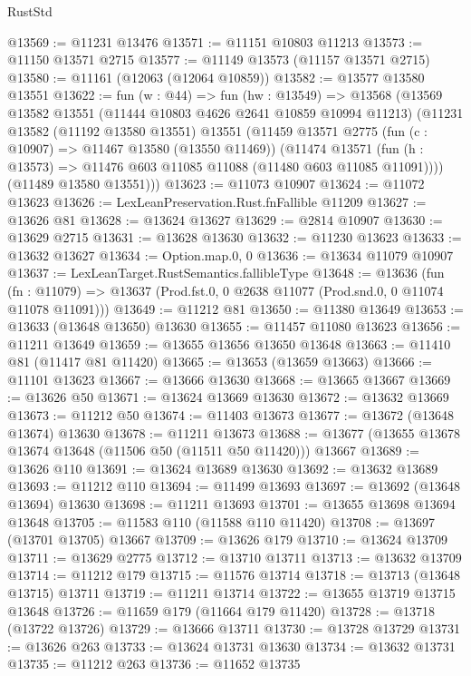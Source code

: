 \begin{lexlean}{RustStd}
\begin{coremodule}
@13569 := @11231 @13476
@13571 := @11151 @10803 @11213
@13573 := @11150 @13571 @2715
@13577 := @11149 @13573 (@11157 @13571 @2715)
@13580 := @11161 (@12063 (@12064 @10859))
@13582 := @13577 @13580 @13551
@13622 := fun (w : @44) =>
  fun (hw : @13549) =>
  @13568
    (@13569
      @13582
      @13551
      (@11444 @10803 @4626 @2641 @10859 @10994 @11213)
      (@11231
        @13582
        (@11192 @13580 @13551)
        @13551
        (@11459
          @13571
          @2775
          (fun (c : @10907) => @11467 @13580 (@13550 @11469))
          (@11474
            @13571
            (fun (h : @13573) => @11476 @603 @11085 @11088 (@11480 @603 @11085 @11091))))
        (@11489 @13580 @13551)))
@13623 := @11073 @10907
@13624 := @11072 @13623
@13626 := LexLeanPreservation.Rust.fnFallible @11209
@13627 := @13626 @81
@13628 := @13624 @13627
@13629 := @2814 @10907
@13630 := @13629 @2715
@13631 := @13628 @13630
@13632 := @11230 @13623
@13633 := @13632 @13627
@13634 := Option.map.{0, 0}
@13636 := @13634 @11079 @10907
@13637 := LexLeanTarget.RustSemantics.fallibleType
@13648 := @13636
    (fun (fn : @11079) =>
    @13637 (Prod.fst.{0, 0} @2638 @11077 (Prod.snd.{0, 0} @11074 @11078 @11091)))
@13649 := @11212 @81
@13650 := @11380 @13649
@13653 := @13633 (@13648 @13650) @13630
@13655 := @11457 @11080 @13623
@13656 := @11211 @13649
@13659 := @13655 @13656 @13650 @13648
@13663 := @11410 @81 (@11417 @81 @11420)
@13665 := @13653 (@13659 @13663)
@13666 := @11101 @13623
@13667 := @13666 @13630
@13668 := @13665 @13667
@13669 := @13626 @50
@13671 := @13624 @13669 @13630
@13672 := @13632 @13669
@13673 := @11212 @50
@13674 := @11403 @13673
@13677 := @13672 (@13648 @13674) @13630
@13678 := @11211 @13673
@13688 := @13677 (@13655 @13678 @13674 @13648 (@11506 @50 (@11511 @50 @11420))) @13667
@13689 := @13626 @110
@13691 := @13624 @13689 @13630
@13692 := @13632 @13689
@13693 := @11212 @110
@13694 := @11499 @13693
@13697 := @13692 (@13648 @13694) @13630
@13698 := @11211 @13693
@13701 := @13655 @13698 @13694 @13648
@13705 := @11583 @110 (@11588 @110 @11420)
@13708 := @13697 (@13701 @13705) @13667
@13709 := @13626 @179
@13710 := @13624 @13709
@13711 := @13629 @2775
@13712 := @13710 @13711
@13713 := @13632 @13709
@13714 := @11212 @179
@13715 := @11576 @13714
@13718 := @13713 (@13648 @13715) @13711
@13719 := @11211 @13714
@13722 := @13655 @13719 @13715 @13648
@13726 := @11659 @179 (@11664 @179 @11420)
@13728 := @13718 (@13722 @13726)
@13729 := @13666 @13711
@13730 := @13728 @13729
@13731 := @13626 @263
@13733 := @13624 @13731 @13630
@13734 := @13632 @13731
@13735 := @11212 @263
@13736 := @11652 @13735

\end{coremodule}
\end{lexlean}
